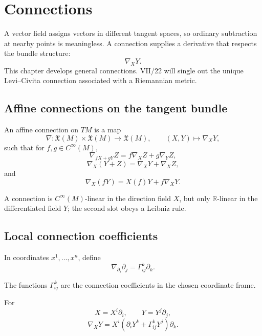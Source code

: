 \chapter{Connections}
\label{ch:vii21-connections}

A vector field assigns vectors in different tangent spaces, so ordinary subtraction
at nearby points is meaningless.  A connection supplies a derivative that respects
the bundle structure:
\[
\boxed{\nabla_XY.}
\]
This chapter develops general connections.  VII/22 will single out the unique
Levi--Civita connection associated with a Riemannian metric.

\section{Affine connections on the tangent bundle}

\begin{definition}\label{def:vii21-affine}
An affine connection on \(TM\) is a map
\[
\nabla:\mathfrak X(M)\times\mathfrak X(M)\to\mathfrak X(M),
\qquad
(X,Y)\mapsto\nabla_XY,
\]
such that for \(f,g\in C^\infty(M)\),
\[
\nabla_{fX+gY}Z=f\nabla_XZ+g\nabla_YZ,
\]
\[
\nabla_X(Y+Z)=\nabla_XY+\nabla_XZ,
\]
and
\[
\nabla_X(fY)=X(f)Y+f\nabla_XY.
\]
\end{definition}

\begin{remark}\label{rem:vii21-slots}
A connection is \(C^\infty(M)\)-linear in the direction field \(X\), but only
\(\mathbb R\)-linear in the differentiated field \(Y\); the second slot obeys a
Leibniz rule.
\end{remark}

\section{Local connection coefficients}

In coordinates \(x^1,\dots,x^n\), define
\[
\nabla_{\partial_i}\partial_j
=
\Gamma^k_{ij}\partial_k.
\]

\begin{definition}\label{def:vii21-christoffel-general}
The functions \(\Gamma^k_{ij}\) are the connection coefficients in the chosen
coordinate frame.
\end{definition}

\begin{proposition}\label{prop:vii21-coordinate}
For
\[
X=X^i\partial_i,\qquad Y=Y^j\partial_j,
\]
\[
\nabla_XY
=
X^i\left(\partial_iY^k+\Gamma^k_{ij}Y^j\right)\partial_k.
\]
\end{proposition}

